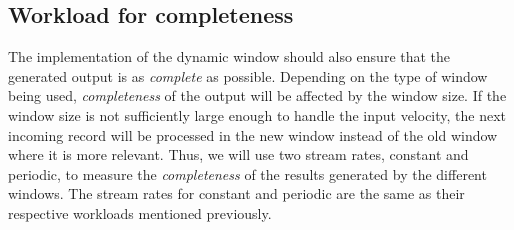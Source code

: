 \subsection{Workload for completeness}
The implementation of the dynamic window should also ensure that the generated 
output is as \emph{complete} as possible. 
Depending on the type of window being used, \emph{completeness} of the output will be
affected by the window size. If the window size is not sufficiently large enough to handle 
the input velocity, the next incoming record will be processed in the new window instead of 
the old window where it is more relevant. Thus, 
we will use two stream rates, constant and periodic, to measure the \emph{completeness} of the results generated 
by the different windows. The stream rates for constant and periodic are the same as their 
respective workloads mentioned previously. 





